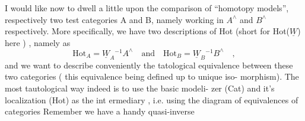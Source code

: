 I would like now to dwell a little upon the comparison of ``homotopy
models'',  respectively  two test categories A and B, namely
working in $A^\wedge$ and $B^\wedge$ respectively. More specifically, we have two
descriptions of Hot (short for Hot($\underline{W}$) here ) , namely as 
\[ \mathrm{Hot}_A = \underline{W}_A{}^{-1}A^\wedge \quad\text{and}\quad \mathrm{Hot}_B = \underline{W}_B{}^{-1}B^\wedge \quad , \]
and we want to describe conveniently the tatological equivalence between
these two categories ( this equivalence being defined up to unique iso-%
morphism). The most tautological way indeed is to use the basic modeli-%
zer (Cat) and it's localization (Hot) as the int ermediary  ,
i.e. using the diagram of equivalences of categories
Remember we have a handy quasi-inverse 

